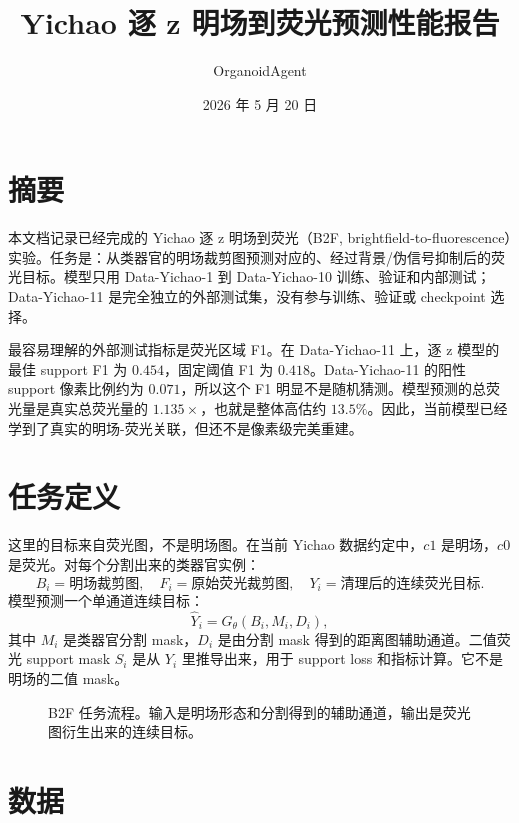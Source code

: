 \documentclass[UTF8,11pt]{ctexart}
\title{Yichao 逐 z 明场到荧光预测性能报告}
\author{OrganoidAgent}
\date{2026 年 5 月 20 日}
\begin{document}
\maketitle

\section*{摘要}

本文档记录已经完成的 Yichao 逐 z 明场到荧光（B2F, brightfield-to-fluorescence）实验。任务是：从类器官的明场裁剪图预测对应的、经过背景/伪信号抑制后的荧光目标。模型只用 Data-Yichao-1 到 Data-Yichao-10 训练、验证和内部测试；Data-Yichao-11 是完全独立的外部测试集，没有参与训练、验证或 checkpoint 选择。

最容易理解的外部测试指标是荧光区域 F1。在 Data-Yichao-11 上，逐 z 模型的最佳 support F1 为 \(0.454\)，固定阈值 F1 为 \(0.418\)。Data-Yichao-11 的阳性 support 像素比例约为 \(0.071\)，所以这个 F1 明显不是随机猜测。模型预测的总荧光量是真实总荧光量的 \(1.135\times\)，也就是整体高估约 \(13.5\%\)。因此，当前模型已经学到了真实的明场-荧光关联，但还不是像素级完美重建。

\section*{任务定义}

这里的目标来自荧光图，不是明场图。在当前 Yichao 数据约定中，\(c1\) 是明场，\(c0\) 是荧光。对每个分割出来的类器官实例：
\[
B_i = \text{明场裁剪图}, \quad
F_i = \text{原始荧光裁剪图}, \quad
Y_i = \text{清理后的连续荧光目标}.
\]
模型预测一个单通道连续目标：
\[
\hat{Y}_i = G_\theta(B_i, M_i, D_i),
\]
其中 \(M_i\) 是类器官分割 mask，\(D_i\) 是由分割 mask 得到的距离图辅助通道。二值荧光 support mask \(S_i\) 是从 \(Y_i\) 里推导出来，用于 support loss 和指标计算。它不是明场的二值 mask。

\begin{figure}[H]
  \centering
  \caption{B2F 任务流程。输入是明场形态和分割得到的辅助通道，输出是荧光图衍生出来的连续目标。}
\end{figure}

\section*{数据}
\end{document}
